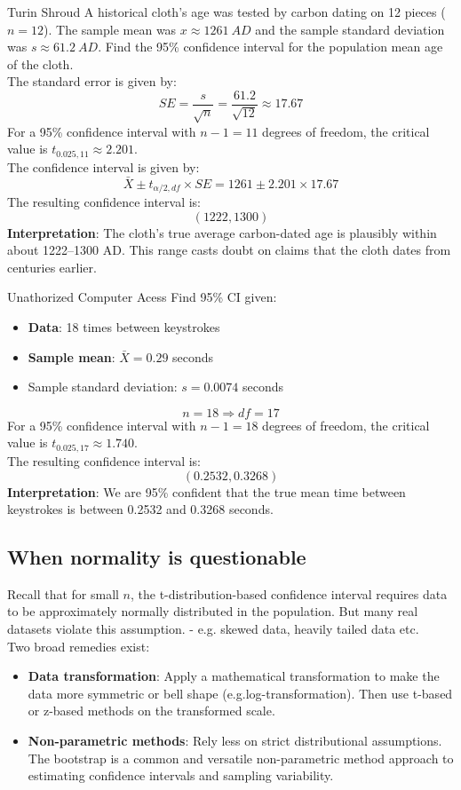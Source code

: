 \documentclass[10pt]{extarticle}
\begin{document}
\begin{examplebox}{Turin Shroud}{}
    A historical cloth's age was tested by carbon dating on 12 pieces ($n = 12$). The sample mean was $x \approx 1261 \ AD$ and the sample standard deviation was $s \approx 61.2 \ AD$. Find the 95\% confidence interval for the population mean age of the cloth. \\[2ex]
    The standard error is given by:
    $$SE = \frac{s}{\sqrt{n}} = \frac{61.2}{\sqrt{12}} \approx 17.67$$
    For a 95\% confidence interval with $n-1 = 11$ degrees of freedom, the critical value is $t_{0.025, 11} \approx 2.201$.\\
    The confidence interval is given by:
    $$\bar{X} \pm t_{\alpha/2, df} \times SE = 1261 \pm 2.201 \times 17.67$$
    The resulting confidence interval is:
    $$(1222, 1300)$$
    \textbf{Interpretation}: The cloth’s true average carbon-dated age is plausibly within about 1222–1300 AD. This range casts doubt on claims that the cloth dates from centuries earlier.
\end{examplebox}
\begin{examplebox}{Unathorized Computer Acess}{}
    Find 95\% CI given:
    \begin{itemize}
        \item \textbf{Data}: 18 times between keystrokes 
        \item \textbf{Sample mean}: $\bar{X} = 0.29$ seconds
        \item Sample standard deviation: $s = 0.0074$ seconds
    \end{itemize}
    $$n  = 18 \Rightarrow df = 17$$
    For a 95\% confidence interval with $n-1 = 18$ degrees of freedom, the critical value is $t_{0.025, 17} \approx 1.740$.\\
    The resulting confidence interval is:
    $$(0.2532, 0.3268)$$
    \textbf{Interpretation}: We are 95\% confident that the true mean time between keystrokes is between 0.2532 and 0.3268 seconds.
\end{examplebox}


\subsection{When normality is questionable}
Recall that for small $n$, the t-distribution-based confidence interval requires data to be approximately normally distributed in the population. But many real datasets violate this assumption. - e.g. skewed data, heavily tailed data etc. \\[2ex]
\noindent Two broad remedies exist:
\begin{itemize}
    \item \textbf{Data transformation}: Apply a mathematical transformation to make the data more symmetric or bell shape (e.g.log-transformation). Then use t-based or z-based methods on the transformed scale.
    \item \textbf{Non-parametric methods}: Rely less on strict distributional assumptions. The bootstrap is a common and versatile non-parametric method approach to estimating confidence intervals and sampling variability.
\end{itemize}
\end{document}
